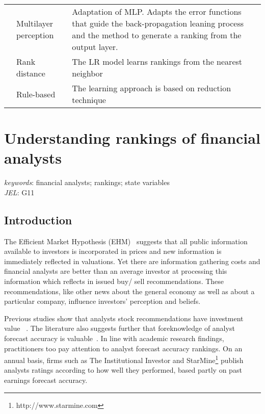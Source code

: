 \documentclass[a4paper,12pt,openright,notitlepage]{report}\usepackage[]{graphicx}\usepackage[]{color}
\begin{document}
\begin{landscape}
\begin{longtable}{p{6cm}p{4cm}p{6cm}p{4cm}}
& Multilayer perception & Adaptation of MLP. Adapts the error functions that guide the back-propagation leaning process and the method to generate a ranking from the output layer.  &\cite{ribeiro2012} \\
&Rank distance & The LR model learns rankings from the nearest neighbor &\cite{brazdil2003}\\
&Rule-based & The learning approach is based on reduction technique&\cite{gurrieri2012} \\
\bottomrule
\end{longtable}
\end{landscape}
\processdelayedfloats
\cleardoublepage

\chapter{Understanding rankings of financial analysts}
\label{ch3}

\begin{abstract}

\end{abstract}

\textit{keywords}: financial analysts; rankings; state variables \\
\textit{JEL}: G11








\section{Introduction}
\label{ch3-sec:introduction}

The Efficient Market Hypothesis (EHM)~\citep{fama1970ecm} suggests that all public information available to investors is incorporated in prices and new information is immediately reflected in valuations. Yet there are information gathering costs and financial analysts are better than an average investor at processing this information which reflects in issued buy/ sell recommendations. These recommendations, like other news about the general economy as well as about a particular company, influence investors' perception and beliefs.

Previous studies show that analysts stock recommendations have investment value ~\citep{womack1996,barber2001}. The literature also suggests further that foreknowledge of analyst forecast accuracy is valuable~\citep{brown2003,aiguzhinov2015a}. In line with academic research findings, practitioners too pay attention to analyst forecast accuracy rankings. On an annual basis, firms such as The Institutional Investor and StarMine\footnote{http://www.starmine.com} publish analysts ratings according to how well they performed, based partly on past earnings forecast accuracy.
\end{document}
